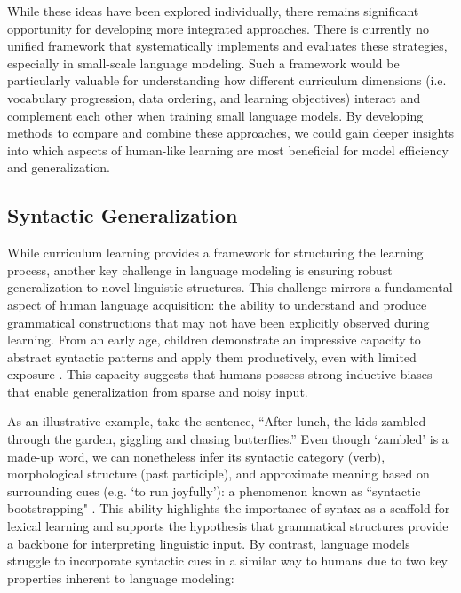 \vspace{1em}

While these ideas have been explored individually, there remains significant opportunity for developing more integrated approaches. There is currently no unified framework that systematically implements and evaluates these strategies, especially in small-scale language modeling. Such a framework would be particularly valuable for understanding how different curriculum dimensions (i.e. vocabulary progression, data ordering, and learning objectives) interact and complement each other when training small language models. By developing methods to compare and combine these approaches, we could gain deeper insights into which aspects of human-like learning are most beneficial for model efficiency and generalization.

\subsection{Syntactic Generalization}

While curriculum learning provides a framework for structuring the learning process, another key challenge in language modeling is ensuring robust generalization to novel linguistic structures. This challenge mirrors a fundamental aspect of human language acquisition: the ability to understand and produce grammatical constructions that may not have been explicitly observed during learning. From an early age, children demonstrate an impressive capacity to abstract syntactic patterns and apply them productively, even with limited exposure \citep{yang2013poverty, legate2002empirical}. This capacity suggests that humans possess strong inductive biases that enable generalization from sparse and noisy input.

As an illustrative example, take the sentence, ``After lunch, the kids zambled through the garden, giggling and chasing butterflies.'' Even though `zambled' is a made-up word, we can nonetheless infer its syntactic category (verb), morphological structure (past participle), and approximate meaning based on surrounding cues (e.g. `to run joyfully'): a phenomenon known as ``syntactic bootstrapping" \citep{gleitman1990structural, naigles1990children}. This ability highlights the importance of syntax as a scaffold for lexical learning and supports the hypothesis that grammatical structures provide a backbone for interpreting linguistic input. By contrast, language models struggle to incorporate syntactic cues in a similar way to humans due to two key properties inherent to language modeling:

